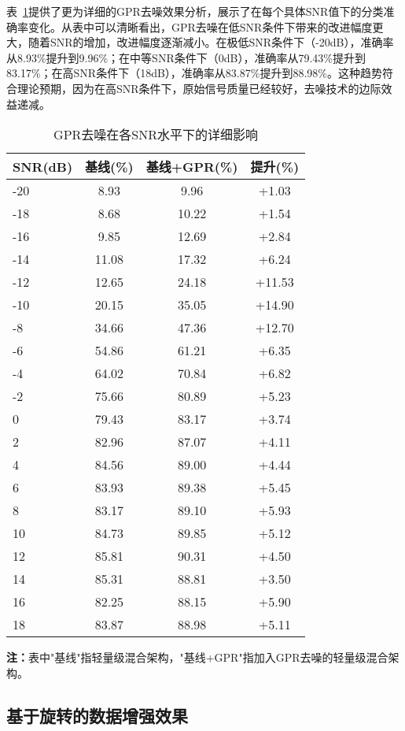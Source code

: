 \documentclass[conference]{IEEEtran}
\begin{document}
表~\ref{tab:gpr_detailed_snr}提供了更为详细的GPR去噪效果分析，展示了在每个具体SNR值下的分类准确率变化。从表中可以清晰看出，GPR去噪在低SNR条件下带来的改进幅度更大，随着SNR的增加，改进幅度逐渐减小。在极低SNR条件下（-20dB），准确率从8.93\%提升到9.96\%；在中等SNR条件下（0dB），准确率从79.43\%提升到83.17\%；在高SNR条件下（18dB），准确率从83.87\%提升到88.98\%。这种趋势符合理论预期，因为在高SNR条件下，原始信号质量已经较好，去噪技术的边际效益递减。

\begin{table}[h]
\centering
\caption{GPR去噪在各SNR水平下的详细影响}
\label{tab:gpr_detailed_snr}
\begin{tabular}{@{}lccc@{}}
\toprule
SNR(dB) & 基线(\%) & 基线+GPR(\%) & 提升(\%) \\
\midrule
-20 & 8.93 & 9.96 & +1.03 \\
-18 & 8.68 & 10.22 & +1.54 \\
-16 & 9.85 & 12.69 & +2.84 \\
-14 & 11.08 & 17.32 & +6.24 \\
-12 & 12.65 & 24.18 & +11.53 \\
-10 & 20.15 & 35.05 & +14.90 \\
-8 & 34.66 & 47.36 & +12.70 \\
-6 & 54.86 & 61.21 & +6.35 \\
-4 & 64.02 & 70.84 & +6.82 \\
-2 & 75.66 & 80.89 & +5.23 \\
0 & 79.43 & 83.17 & +3.74 \\
2 & 82.96 & 87.07 & +4.11 \\
4 & 84.56 & 89.00 & +4.44 \\
6 & 83.93 & 89.38 & +5.45 \\
8 & 83.17 & 89.10 & +5.93 \\
10 & 84.73 & 89.85 & +5.12 \\
12 & 85.81 & 90.31 & +4.50 \\
14 & 85.31 & 88.81 & +3.50 \\
16 & 82.25 & 88.15 & +5.90 \\
18 & 83.87 & 88.98 & +5.11 \\
\bottomrule
\end{tabular}
\end{table}

\textbf{注：}表中"基线"指轻量级混合架构，"基线+GPR"指加入GPR去噪的轻量级混合架构。

\subsection{基于旋转的数据增强效果}
\end{document}

